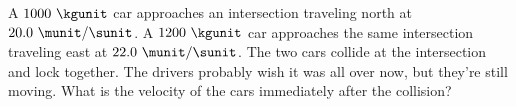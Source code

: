 A $1000\ \kgunit$ car approaches an intersection traveling north at
$20.0\ \munit/\sunit$. A $1200\ \kgunit$ car approaches the same
intersection traveling east at $22.0\ \munit/\sunit$. The two cars
collide at the intersection and lock together. The drivers probably
wish it was all over now, but they're still moving. What is the
velocity of the cars immediately after the collision?\answercheck
